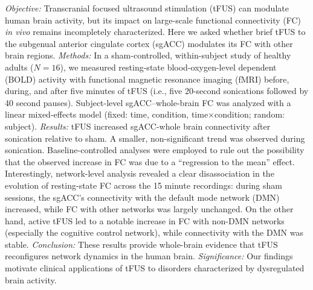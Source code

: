 \emph{Objective:} Transcranial focused ultrasound stimulation (tFUS) can modulate human brain activity, but its impact on large-scale functional connectivity (FC) \emph{in vivo} remains incompletely characterized. Here we asked whether brief tFUS to the subgenual anterior cingulate cortex (sgACC) modulates its FC with other brain regions.
\emph{Methods:}  In a sham-controlled, within-subject study of healthy adults ($N=16$), we measured resting-state blood-oxygen-level dependent (BOLD) activity with functional magnetic resonance imaging (fMRI) before, during, and after five minutes of tFUS (i.e., five 20-second sonications followed by 40 second pauses). Subject-level sgACC–whole-brain FC was analyzed with a linear mixed-effects model (fixed: time, condition, time×condition; random: subject). 
\emph{Results:} tFUS increased sgACC-whole brain connectivity after sonication relative to sham. A smaller, non-significant trend was observed during sonication. Baseline-controlled analyses were employed to rule out the possibility that the observed increase in FC was due to a ``regression to the mean'' effect. Interestingly, network-level analysis revealed a clear disassociation in the evolution of resting-state FC across the 15 minute recordings: during sham sessions, the sgACC's connectivity with the default mode network (DMN) increased, while FC with other networks was largely unchanged. On the other hand, active tFUS led to a notable increase in FC with non-DMN networks (especially the cognitive control network), while connectivity with the DMN was stable. 
\emph{Conclusion:} These results provide whole-brain evidence that tFUS reconfigures network dynamics in the human brain.  
\emph{Significance:} Our findings motivate clinical applications of tFUS to disorders characterized by dysregulated brain activity.

